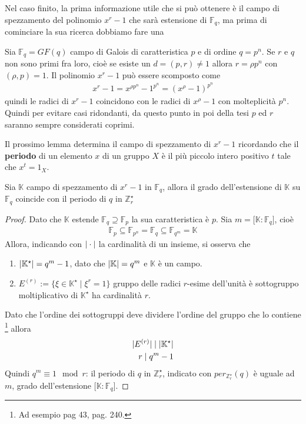 Nel caso finito, la prima informazione utile che si può ottenere è il campo di spezzamento del polinomio $x^r-1$ che sarà estensione di $\mathbb{F}_{q}$, ma prima di cominciare la sua ricerca dobbiamo fare una
\begin{osservazione}\label{cap2:osservaziorp}
Sia $\mathbb{F}_{q} = GF(q)$ campo di Galois di caratteristica $p$ e di ordine $q=p^n$. Se $r$ e $q$ non sono primi fra loro, cioè se esiste un $d = (p,r) \neq 1$ allora $r = \rho p^n$ con $(\rho,p) = 1$. Il polinomio $x^r-1$ può essere scomposto come
\begin{align*}
x^r-1 =  x^{\rho p^n} - 1^{p^{n}} = (x^{\rho}-1)^{p^n}
\end{align*}
quindi le radici di $x^r-1$ coincidono con le radici di $x^{\rho}-1$ con molteplicità $p^n$.
Quindi per evitare casi ridondanti, da questo punto in poi della tesi $p$ ed $r$ saranno sempre considerati coprimi.
\end{osservazione}
Il prossimo lemma determina il campo di spezzamento di $x^r-1$ ricordando che il {\bf periodo} di un elemento $x$ di un gruppo $X$ è il più piccolo intero positivo $t$ tale che $x^t = 1_{X}$.
\begin{lemmax} \label{le:campoDiSpezzamento}
Sia $\mathbb{K}$ campo di spezzamento di $x^r-1$ in $\mathbb{F}_{q}$, allora il grado dell'estensione di $\mathbb{K}$ su $\mathbb{F}_{q}$ coincide con il periodo di $q$ in $\mathbb{Z}_{r}^{\star}$
\end{lemmax}
\begin{proof}
Dato che $\mathbb{K}$ estende $\mathbb{F}_{q} \supseteq \mathbb{F}_{p}$ la sua caratteristica è $p$.
Sia $m = \lbrack \mathbb{K} : \mathbb{F}_{q} \rbrack$, cioè
\begin{align*}
   \mathbb{F}_{p} \subseteq \mathbb{F}_{p^n} =  \mathbb{F}_{q}\subseteq \mathbb{F}_{q^m} = \mathbb{K}
\end{align*}
Allora, indicando con $\arrowvert \cdot \arrowvert$ la cardinalità di un insieme, si osserva che
\begin{enumerate}
   \item $\arrowvert \mathbb{K}^{\star} \arrowvert = q^m -1$, dato che $\arrowvert \mathbb{K} \arrowvert = q^m$ e $\mathbb{K}$ è un campo.
   \item $E^{(r)} := \lbrace \xi \in \mathbb{K}^{\star} \mid \xi^{r} = 1 \rbrace$ gruppo delle radici $r$-esime dell'unità è sottogruppo moltiplicativo di $\mathbb{K}^{\star}$ ha cardinalità $r$.
\end{enumerate}
Dato che l'ordine dei sottogruppi deve dividere l'ordine del gruppo che lo contiene
\footnote{Ad esempio \cite{herstein} pag 43, \cite{cattaneo} pag. 240.}
allora
\begin{align*}
   \arrowvert E^{(r)} \arrowvert \mid \arrowvert \mathbb{K}^{\star} \arrowvert \\
   r \mid q^m - 1
\end{align*}
Quindi $q^m \equiv 1 \mod{r}$: il periodo di $q$ in $\mathbb{Z}_{r}^{\star}$, indicato con
$per_{\mathbb{Z}_{r}^{\star}}(q)$ è uguale ad $m$, grado dell'estensione $\lbrack \mathbb{K} : \mathbb{F}_{q} \rbrack$.
\end{proof}

